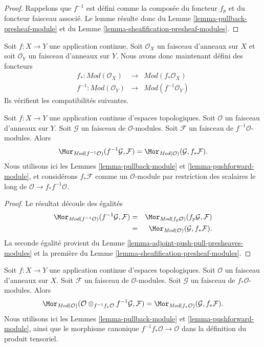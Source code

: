 \begin{proof}
Rappelons que $f^{-1}$ est défini comme la composée du
foncteur $f_p$ et du foncteur faisceau associé. Le lemme
résulte donc du Lemme \ref{lemma-pullback-presheaf-module}
et du Lemme \ref{lemma-sheafification-presheaf-modules}.
\end{proof}

\noindent
Soit $f : X \to Y$ une application continue.
Soit $\mathcal{O}_X$ un faisceau d'anneaux sur $X$ et
soit $\mathcal{O}_Y$ un faisceau d'anneaux sur $Y$.
Nous avons donc maintenant défini des foncteurs
\begin{eqnarray*}
f_* : \textit{Mod}(\mathcal{O}_X) &
\longrightarrow &
\textit{Mod}(f_*\mathcal{O}_X) \\
f^{-1} : \textit{Mod}(\mathcal{O}_Y) &
\longrightarrow &
\textit{Mod}(f^{-1}\mathcal{O}_Y)
\end{eqnarray*}
Ils vérifient les compatibilités suivantes.

\begin{lemma}
\label{lemma-adjoint-push-pull-modules}
Soit $f : X \to Y$ une application continue d'espaces topologiques.
Soit $\mathcal{O}$ un faisceau d'anneaux sur $Y$.
Soit $\mathcal{G}$ un faisceau de $\mathcal{O}$-modules.
Soit $\mathcal{F}$ un faisceau de $f^{-1}\mathcal{O}$-modules.
Alors
$$
\Mor_{\textit{Mod}(f^{-1}\mathcal{O})}(f^{-1}\mathcal{G}, \mathcal{F})
=
\Mor_{\textit{Mod}(\mathcal{O})}(\mathcal{G}, f_*\mathcal{F}).
$$
Nous utilisons ici
les Lemmes \ref{lemma-pullback-module}
et \ref{lemma-pushforward-module}, et considérons
$f_*\mathcal{F}$ comme un $\mathcal{O}$-module par restriction des scalaires le long de
$\mathcal{O} \to f_*f^{-1}\mathcal{O}$.
\end{lemma}

\begin{proof}
Le résultat découle des égalités
\begin{eqnarray*}
\Mor_{\textit{Mod}(f^{-1}\mathcal{O})}(f^{-1}\mathcal{G}, \mathcal{F})
& = &
\Mor_{\textit{Mod}(f_p\mathcal{O})}(f_p\mathcal{G}, \mathcal{F}) \\
& = &
\Mor_{\textit{Mod}(\mathcal{O})}(\mathcal{G}, f_*\mathcal{F}).
\end{eqnarray*}
La seconde égalité provient du
Lemme \ref{lemma-adjoint-push-pull-presheaves-modules}
et la première du Lemme \ref{lemma-sheafification-presheaf-modules}.
\end{proof}

\begin{lemma}
\label{lemma-adjoint-pull-push-modules}
Soit $f : X \to Y$ une application continue d'espaces topologiques.
Soit $\mathcal{O}$ un faisceau d'anneaux sur $X$.
Soit $\mathcal{F}$ un faisceau de $\mathcal{O}$-modules.
Soit $\mathcal{G}$ un faisceau de $f_*\mathcal{O}$-modules.
Alors
$$
\Mor_{\textit{Mod}(\mathcal{O})}(
\mathcal{O} \otimes_{f^{-1}f_*\mathcal{O}} f^{-1}\mathcal{G}, \mathcal{F})
=
\Mor_{\textit{Mod}(f_*\mathcal{O})}(\mathcal{G}, f_*\mathcal{F}).
$$
Nous utilisons ici
les Lemmes \ref{lemma-pullback-module}
et \ref{lemma-pushforward-module}, ainsi que
le morphisme canonique $f^{-1}f_*\mathcal{O} \to \mathcal{O}$
dans la définition du produit tensoriel.
\end{lemma}


